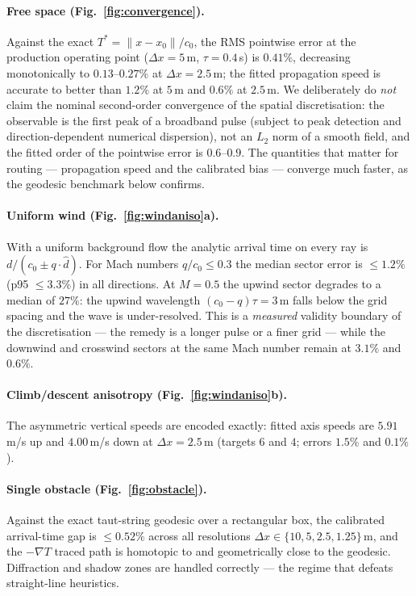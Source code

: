 \paragraph{Free space (Fig.~\ref{fig:convergence}).}
Against the exact $T^\ast = \lVert x - x_0\rVert / c_0$, the RMS
pointwise error at the production operating point ($\Delta x = 5\,$m,
$\tau = 0.4\,$s) is $0.41\%$, decreasing monotonically to
$0.13$--$0.27\%$ at $\Delta x = 2.5\,$m; the fitted propagation speed
is accurate to better than $1.2\%$ at $5\,$m and $0.6\%$ at $2.5\,$m.
We deliberately do \emph{not} claim the nominal second-order
convergence of the spatial discretisation: the observable is the
first peak of a broadband pulse (subject to peak detection and
direction-dependent numerical dispersion), not an $L_2$ norm of a
smooth field, and the fitted order of the pointwise error is
$0.6$--$0.9$. The quantities that matter for routing --- propagation
speed and the calibrated bias --- converge much faster, as the
geodesic benchmark below confirms.

\paragraph{Uniform wind (Fig.~\ref{fig:windaniso}a).}
With a uniform background flow the analytic arrival time on every
ray is $d/(c_0 \pm q\cdot\hat d)$. For Mach numbers
$q/c_0 \le 0.3$ the median sector error is $\le 1.2\%$ (p95
$\le 3.3\%$) in all directions. At $M = 0.5$ the upwind sector
degrades to a median of $27\%$: the upwind wavelength
$(c_0 - q)\tau = 3\,$m falls below the grid spacing and the wave is
under-resolved. This is a \emph{measured} validity boundary of the
discretisation --- the remedy is a longer pulse or a finer grid ---
while the downwind and crosswind sectors at the same Mach number
remain at $3.1\%$ and $0.6\%$.

\paragraph{Climb/descent anisotropy (Fig.~\ref{fig:windaniso}b).}
The asymmetric vertical speeds are encoded exactly: fitted axis
speeds are $5.91\,$m/s up and $4.00\,$m/s down at
$\Delta x = 2.5\,$m (targets $6$ and $4$; errors $1.5\%$ and
$0.1\%$).

\paragraph{Single obstacle (Fig.~\ref{fig:obstacle}).}
Against the exact taut-string geodesic over a rectangular box, the
calibrated arrival-time gap is $\le 0.52\%$ across all resolutions
$\Delta x \in \{10, 5, 2.5, 1.25\}\,$m, and the $-\nabla T$ traced
path is homotopic to and geometrically close to the geodesic.
Diffraction and shadow zones are handled correctly --- the regime
that defeats straight-line heuristics.


